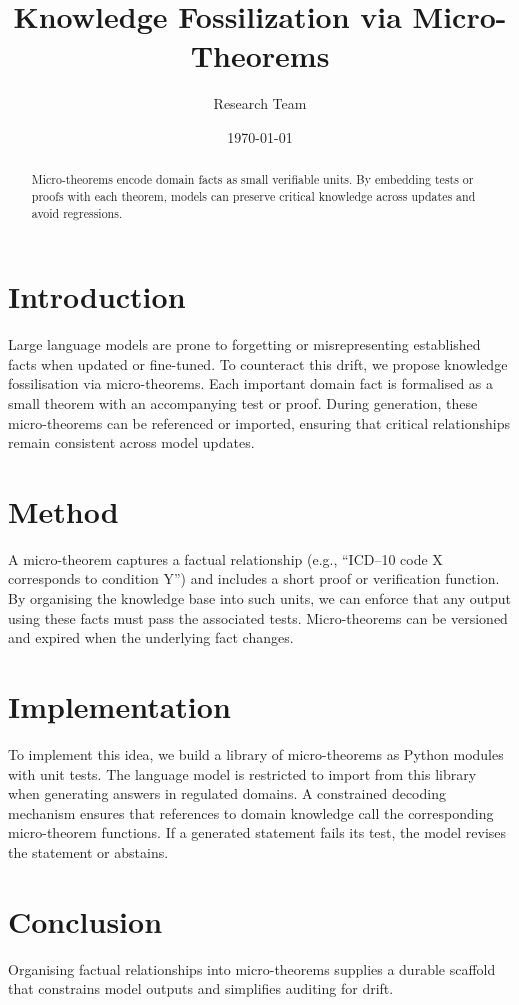 \documentclass{article}
\title{Knowledge Fossilization via Micro-Theorems}
\author{Research Team}
\date{\today}
\begin{document}
\maketitle

\begin{abstract}
Micro-theorems encode domain facts as small verifiable units. By
embedding tests or proofs with each theorem, models can preserve
critical knowledge across updates and avoid regressions.
\end{abstract}

\section{Introduction}
Large language models are prone to forgetting or misrepresenting
established facts when updated or fine-tuned. To counteract this drift,
we propose knowledge fossilisation via micro-theorems. Each important
domain fact is formalised as a small theorem with an accompanying test
or proof. During generation, these micro-theorems can be referenced or
imported, ensuring that critical relationships remain consistent across
model updates.

\section{Method}
A micro-theorem captures a factual relationship (e.g., ``ICD--10 code X
corresponds to condition Y'') and includes a short proof or
verification function. By organising the knowledge base into such
units, we can enforce that any output using these facts must pass the
associated tests. Micro-theorems can be versioned and expired when the
underlying fact changes.

\section{Implementation}
To implement this idea, we build a library of micro-theorems as Python
modules with unit tests. The language model is restricted to import from
this library when generating answers in regulated domains. A
constrained decoding mechanism ensures that references to domain
knowledge call the corresponding micro-theorem functions. If a
generated statement fails its test, the model revises the statement or
abstains.

\section{Conclusion}
Organising factual relationships into micro-theorems supplies a durable
scaffold that constrains model outputs and simplifies auditing for
drift.
\end{document}
